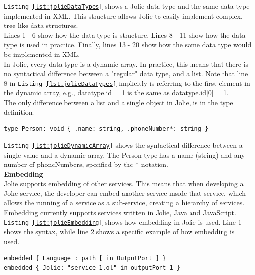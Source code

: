 \documentclass[12pt,a4paper]{article}
\begin{document}
\texttt{Listing \ref{lst:jolieDataTypes}} shows a Jolie data type and the same data type implemented in XML. This structure allows Jolie to easily implement complex, tree like data structures. \\
Lines 1 - 6 show how the data type is structure. Lines 8 - 11 show how the data type is used in practice. Finally, lines 13 - 20 show how the same data type would be implemented in XML.\\

In Jolie, every data type is a dynamic array. In practice, this means that there is no syntactical difference between a "regular" data type, and a list. Note that line 8 in \texttt{Listing \ref{lst:jolieDataTypes}} implicitly is referring to the first element in the dynamic array, e.g., datatype.id = 1 is the same as datatype.id[0] = 1.\\
The only difference between a list and a single object in Jolie, is in the type definition.

\begin{lstlisting}[caption={Jolie dynamic array},label={lst:jolieDynamicArray}]
type Person: void { .name: string, .phoneNumber*: string }
\end{lstlisting}

\texttt{Listing \ref{lst:jolieDynamicArray}} shows the syntactical difference between a single value and a dynamic array. The Person type has a name (string) and any number of phoneNumbers, specified by the * notation.\\

\textbf{Embedding} \\
Jolie supports embedding of other services. This means that when developing a Jolie service, the developer can embed another service inside that service, which allows the running of a service as a sub-service, creating a hierarchy of services. Embedding currently supports services written in Jolie, Java and JavaScript. \\
\texttt{Listing \ref{lst:jolieEmbedding}} shows how embedding in Jolie is used. Line 1 shows the syntax, while line 2 shows a specific example of how embedding is used.

\begin{lstlisting}[caption={Jolie embedding},label={lst:jolieEmbedding}]
embedded { Language : path [ in OutputPort ] }
embedded { Jolie: "service_1.ol" in outputPort_1 }
\end{lstlisting}
\end{document}
